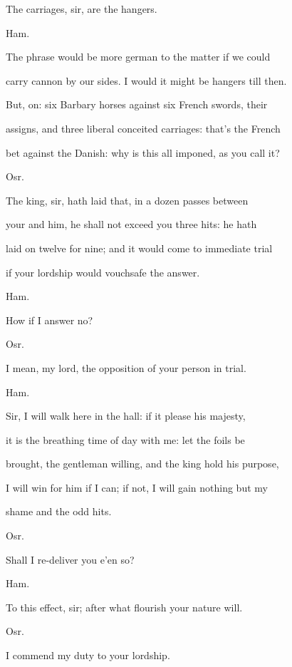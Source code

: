 \documentclass[12pt]{book}
\begin{document}
The carriages, sir, are the hangers.



Ham.

The phrase would be more german to the matter if we could

carry cannon by our sides. I would it might be hangers till then.

But, on: six Barbary horses against six French swords, their

assigns, and three liberal conceited carriages: that's the French

bet against the Danish: why is this all imponed, as you call it?



Osr.

The king, sir, hath laid that, in a dozen passes between

your and him, he shall not exceed you three hits: he hath

laid on twelve for nine; and it would come to immediate trial

if your lordship would vouchsafe the answer.



Ham.

How if I answer no?



Osr.

I mean, my lord, the opposition of your person in trial.



Ham.

Sir, I will walk here in the hall: if it please his majesty,

it is the breathing time of day with me: let the foils be

brought, the gentleman willing, and the king hold his purpose,

I will win for him if I can; if not, I will gain nothing but my

shame and the odd hits.



Osr.

Shall I re-deliver you e'en so?



Ham.

To this effect, sir; after what flourish your nature will.



Osr.

I commend my duty to your lordship.
\end{document}
